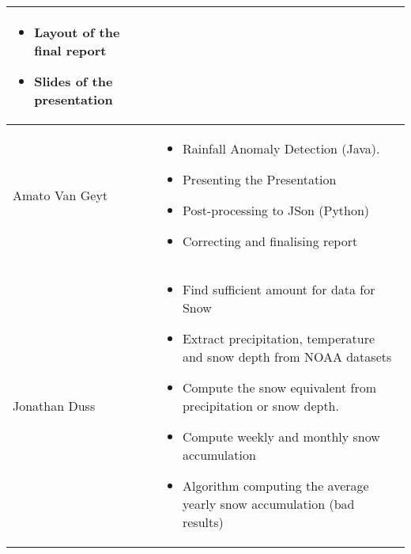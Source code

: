 \begin{longtable}{|l|p{10.5cm}|}
\begin{itemize}
	\item Layout of the final report
	\item Slides of the presentation
\end{itemize}\\
\hline
Amato Van Geyt & \begin{itemize}
	\item Rainfall Anomaly Detection (Java).
	\item Presenting the Presentation
	\item Post-processing to JSon (Python)
	\item Correcting and finalising report
\end{itemize}\\ 
\hline
Jonathan Duss & \begin{itemize}
	\item Find sufficient amount for data for Snow
	\item Extract precipitation, temperature and snow depth from NOAA datasets
	\item Compute the snow equivalent from precipitation or snow depth.
	\item Compute weekly and monthly snow accumulation
	\item Algorithm computing the average yearly snow accumulation  (bad results)
\end{itemize}\\ 
\hline
\end{longtable}
